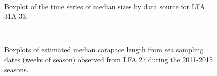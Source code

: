 \documentclass[11pt]{article}
\newcommand{\e}{/backup/bio_data/bio.lobster/figures/} %
\begin{document}
\begin{figure}
        \centering
         \\
                     \caption{Boxplot of the time series of median sizes by data source for LFA 31A-33.}
        \end{figure}


\begin{figure}
        \centering
         \\
                     \caption{Boxplots of estimated median carapace length from sea sampling dates (weeks of season) observed from LFA 27 during the 2011-2015 seasons. }
        \end{figure}
\end{document}
